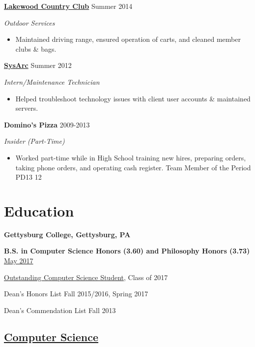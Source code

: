 \documentclass[11pt]{article}
\begin{document}
\textbf{\href{http://www.lakewoodcc.org/}{Lakewood Country Club}}
\hfill
Summer 2014

\textit{Outdoor Services}

\begin{itemize}
\item[] Maintained driving range, ensured operation of carts, and cleaned member clubs \& bags.\\
\end{itemize}

\textbf{\href{http://www.sysarc.com/}{SysArc}}
\hfill
Summer 2012

\textit{Intern/Maintenance Technician}

\begin{itemize}
\item[]  Helped troubleshoot technology issues with client user accounts \& maintained servers.\\
\end{itemize}

\textbf{Domino's Pizza}
\hfill
2009-2013

\textit{Insider \small{(Part-Time)}}

\begin{itemize}
\item[]  Worked part-time while in High School training new hires, preparing orders, taking phone orders, and operating cash register.  Team Member of the Period PD13 12
\end{itemize}

\section*{Education}
\textbf{Gettysburg College, Gettysburg, PA}

\textbf{B.S. in Computer Science {\footnotesize Honors (3.60)} and Philosophy {\footnotesize Honors (3.73)}}
\hfill
\href{https://www.gettysburg.edu/commencement/2017/pdfs/2017\%20Commencement\%20Program\%20FINAL.pdf}{May 2017}

\href{http://www.gettysburg.edu/academics/cs/programs/honors.dot}{Outstanding Computer Science Student}, Class of 2017

Dean's Honors List \hfill Fall 2015/2016, Spring 2017

Dean's Commendation List \hfill Fall 2013

\subsection*{\underline{Computer Science}}
\end{document}

